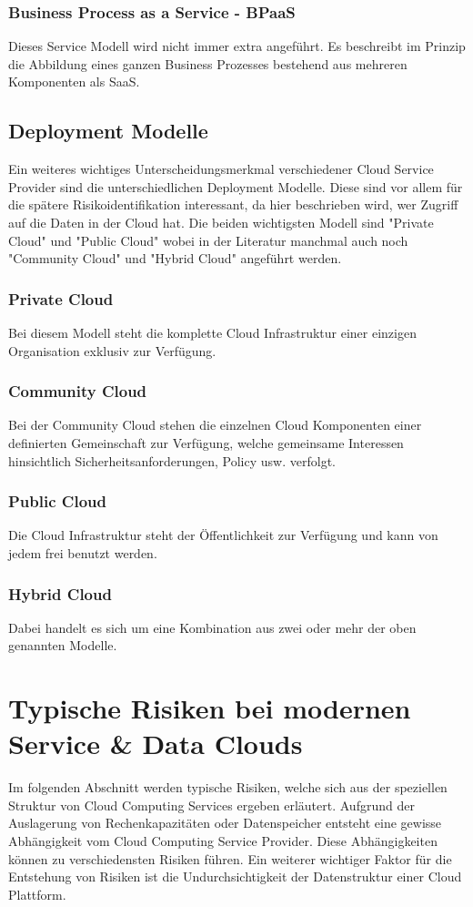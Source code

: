 \documentclass{report}
\begin{document}
\subsubsection{Business Process as a Service - BPaaS}
Dieses Service Modell wird nicht immer extra angeführt. Es beschreibt im Prinzip die Abbildung eines ganzen Business Prozesses bestehend aus mehreren Komponenten als SaaS.

\subsection{Deployment Modelle}
Ein weiteres wichtiges Unterscheidungsmerkmal verschiedener Cloud Service Provider sind die unterschiedlichen Deployment Modelle. Diese sind vor allem für die spätere Risikoidentifikation interessant, da hier beschrieben wird, wer Zugriff auf die Daten in der Cloud hat. Die beiden wichtigsten Modell sind "Private Cloud" und "Public Cloud" wobei in der Literatur manchmal auch noch "Community Cloud" und "Hybrid Cloud" angeführt werden.

\subsubsection{Private Cloud}
Bei diesem Modell steht die komplette Cloud Infrastruktur einer einzigen Organisation exklusiv zur Verfügung.

\subsubsection{Community Cloud}
Bei der Community Cloud stehen die einzelnen Cloud Komponenten einer definierten Gemeinschaft zur Verfügung, welche gemeinsame Interessen hinsichtlich Sicherheitsanforderungen, Policy usw. verfolgt.

\subsubsection{Public Cloud}
Die Cloud Infrastruktur steht der Öffentlichkeit zur Verfügung und kann von jedem frei benutzt werden.

\subsubsection{Hybrid Cloud}
Dabei handelt es sich um eine Kombination aus zwei oder mehr der oben genannten Modelle.

\section{Typische Risiken bei modernen Service \& Data Clouds}
Im folgenden Abschnitt werden typische Risiken, welche sich aus der speziellen Struktur von Cloud Computing Services ergeben erläutert. Aufgrund der Auslagerung von Rechenkapazitäten oder Datenspeicher entsteht eine gewisse Abhängigkeit vom Cloud Computing Service Provider. Diese Abhängigkeiten können zu verschiedensten Risiken führen. Ein weiterer wichtiger Faktor für die Entstehung von Risiken ist die Undurchsichtigkeit der Datenstruktur einer Cloud Plattform.  
\end{document}
